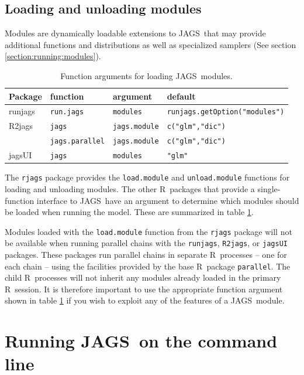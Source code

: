 \documentclass[11pt, a4paper, titlepage]{report}
\newcommand{\JAGS}{\textsf{JAGS}}
\newcommand{\R}{\textsf{R}}
\begin{document}
\section{Loading and unloading modules}
\label{section:R:modules}

Modules are dynamically loadable extensions to \JAGS\ that may provide
additional functions and distributions as well as specialized
samplers (See section \ref{section:running:modules}).

\begin{table}
\begin{tabular}{llll}
  \hline
  Package & function & argument & default \\
  \hline
  runjags & \texttt{run.jags} & \texttt{modules} & \texttt{runjags.getOption("modules")} \\
  R2jags  & \texttt{jags} & \texttt{jags.module} & \texttt{c("glm","dic")} \\
  & \texttt{jags.parallel} & \texttt{jags.module} & \texttt{c("glm","dic")} \\
  jagsUI  & \texttt{jags} & \texttt{modules} & \texttt{"glm"} \\
  \hline
\end{tabular}
\caption{Function arguments for loading \JAGS\ modules. \label{table:modules}}
\end{table}

The \texttt{rjags} package provides the \texttt{load.module} and
\texttt{unload.module} functions for loading and unloading
modules. The other \R\ packages that provide a single-function
interface to \JAGS\ have an argument to determine which modules should
be loaded when running the model. These are summarized in table
\ref{table:modules}.

Modules loaded with the \texttt{load.module} function from the
\texttt{rjags} package will not be available when running parallel
chains with the \texttt{runjags}, \texttt{R2jags}, or \texttt{jagsUI}
packages. These packages run parallel chains in separate \R\ processes
-- one for each chain -- using the facilities provided by the base \R\ 
package \texttt{parallel}. The child \R\ processes will not inherit any
modules already loaded in the primary \R\ session. It is therefore
important to use the appropriate function argument shown in table
\ref{table:modules} if you wish to exploit any of the features of a
\JAGS\ module.


\chapter{Running \JAGS\ on the command line}
\label{chapter:cmdline}
\end{document}

